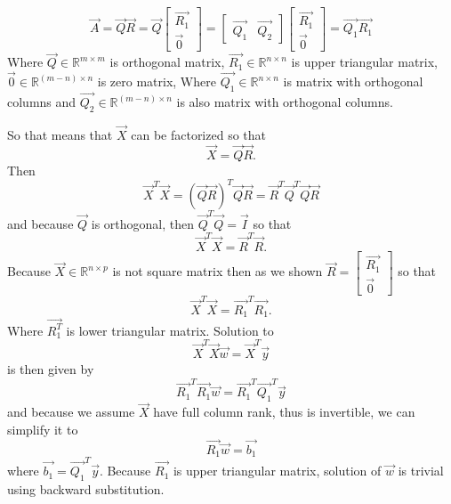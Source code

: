 	\begin{equation}
		\vec{A} = \vec{Q}\vec{R} = \vec{Q} \begin{bmatrix}
			\vec{R_1} \\
			\vec{0}
		\end{bmatrix}
		=  \begin{bmatrix}
			\vec{Q_1} & \vec{Q_2}
		\end{bmatrix}  \begin{bmatrix}
			\vec{R_1} \\
			\vec{0}
		\end{bmatrix} 
		= \vec{Q_1} \vec{R_1}
	\end{equation}
	Where $\vec{Q} \in \mathbb{R}^{m \times m}$ is orthogonal matrix, $\vec{R_1} \in \mathbb{R}^{n \times n} $ is upper triangular matrix, $\vec{0} \in \mathbb{R}^{ (m-n) \times n} $  is zero matrix,  Where $\vec{Q_1} \in \mathbb{R}^{n \times n}$ is matrix with orthogonal columns and  $\vec{Q_2} \in \mathbb{R}^{(m-n) \times n}$ is also matrix with orthogonal columns.
	
So that means that $\vec{X}$ can be factorized so that 
\begin{equation}
	\vec{X} = \vec{Q}\vec{R}.
\end{equation}
Then
\begin{equation}
	\vec{X}^T\vec{X} = (\vec{Q}\vec{R})^T \vec{Q}\vec{R} = \vec{R}^T\vec{Q}^T\vec{Q}\vec{R}
\end{equation}
and because $\vec{Q}$ is orthogonal, then $\vec{Q}^T\vec{Q} = \vec{I}$ so that
\begin{equation}
	\vec{X}^T\vec{X} = \vec{R}^T\vec{R}.
\end{equation}
Because $\vec{X} \in  \mathbb{R}^{n \times p}$ is not square matrix then as we shown $\vec{R} = \begin{bmatrix}
	\vec{R_1} \\
	\vec{0}
\end{bmatrix}$
so that 
\begin{equation}
	\vec{X}^T\vec{X} = \vec{R_1}^T\vec{R_1}.
\end{equation}
 Where $\vec{R_1^T}$ is lower triangular matrix. 
Solution to
\begin{equation}
	\vec{X}^T\vec{X}\vec{w} = \vec{X}^T\vec{y}
\end{equation}
is then given by 
\begin{equation}
	\vec{R_1}^T\vec{R_1}\vec{w} = \vec{R_1}^T\vec{Q_1}^T \vec{y}
\end{equation}
and because we assume $\vec{X}$ have full column rank, thus is invertible, we can simplify it to
\begin{equation}
	\vec{R_1}\vec{w} = \vec{b_1}
\end{equation}
where $ \vec{b_1} = \vec{Q_1}^T \vec{y}$. Because $\vec{R_1}$ is upper triangular matrix, solution of $\vec{w}$ is trivial using backward substitution. 

